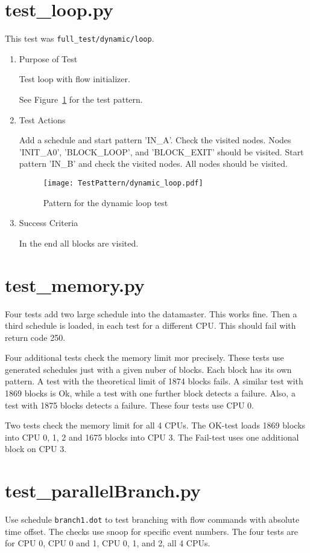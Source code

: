 \documentclass[12pt,a4paper]{report}
\begin{document}
\section{test\_loop.py}
This test was \texttt{full\_test/dynamic/loop}.
\begin{enumerate}
	\item Purpose of Test

        Test loop with flow initializer.

	See Figure~\ref{fig:Pattern_for_the_dynamic_loop_test} for the test pattern.
	\item Test Actions

        Add a schedule and start pattern 'IN\_A'. Check the visited nodes. Nodes 'INIT\_A0', 'BLOCK\_LOOP', and 'BLOCK\_EXIT'
        should be visited. Start pattern 'IN\_B' and check the visited nodes. All nodes should be visited.
    \begin{figure}
        \centering
        \texttt{[image: TestPattern/dynamic\_loop.pdf]}
        \caption{Pattern for the dynamic loop test}
        \label{fig:Pattern_for_the_dynamic_loop_test}
    \end{figure}
	\item Success Criteria

	In the end all blocks are visited.
\end{enumerate}
\section{test\_memory.py}
Four tests add two large schedule into the datamaster. This works fine. 
Then a third schedule is loaded, in each test for a different CPU. This 
should fail with return code 250.

Four additional tests check the memory limit mor precisely. These tests
use generated schedules just with a given nuber of blocks. Each block 
has its own pattern. A test with the theoretical limit of 1874 blocks 
fails. A similar test with 1869 blocks is Ok, while a test with one 
further block detects a failure. Also, a test with 1875 blocks detects a 
failure. These four tests use CPU 0.

Two tests check the memory limit for all 4 CPUs. The OK-test loads 1869 
blocks into CPU 0, 1, 2 and 1675 blocks into CPU 3. The Fail-test uses 
one additional block on CPU 3.

\section{test\_parallelBranch.py}
Use schedule \texttt{branch1.dot} to test branching with flow commands
with absolute time offset. The checks use snoop for specific event numbers.
The four tests are for CPU 0, CPU 0 and 1, CPU 0, 1, and 2, all 4 CPUs.
\end{document}
